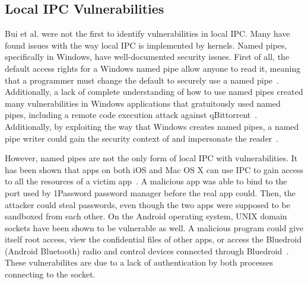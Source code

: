 \subsection{Local IPC Vulnerabilities}
Bui et al. were not the first to identify vulnerabilities in local IPC.  Many have found issues with the way local IPC is implemented by kernels.  Named pipes, specifically in Windows, have well-documented security issues.  First of all, the default access rights for a Windows named pipe allow anyone to read it, meaning that a programmer must change the default to securely use a named pipe~\cite{microsoft_2018}.  Additionally, a lack of complete understanding of how to use named pipes created many vulnerabilities in Windows applications that gratuitously used named pipes, including a remote code execution attack against qBittorrent~\cite{cohen_2019}.  Additionally, by exploiting the way that Windows creates named pipes, a named pipe writer could gain the security context of and impersonate the reader~\cite{watts2002discovering}.

However, named pipes are not the only form of local IPC with vulnerabilities.  It has been shown that apps on both iOS and Mac OS X can use IPC to gain access to all the resources of a victim app~\cite{Xing_2015_CAI_2810103_2813609}.  A malicious app was able to bind to the port used by 1Password password manager before the real app could.  Then, the attacker could steal passwords, even though the two apps were supposed to be sandboxed from each other.  On the Android operating system, UNIX domain sockets have been shown to be vulnerable as well.  A malicious program could give itself root access, view the confidential files of other apps, or access the Bluedroid (Android Bluetooth) radio and control devices connected through Bluedroid~\cite{Shao_2016_MAU_2976749_2978297}.  These vulnerabilites are due to a lack of authentication by both processes connecting to the socket.